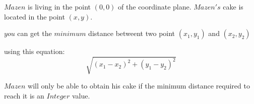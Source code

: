 $Mazen$ is living in the point $(0,0)$ of the coordinate plane. $Mazen's$ cake is located in the point $(x,y)$.

$you$ can get the $minimum$ distance betweent two point $(x_1,y_1)$ and $(x_2,y_2)$

using this equation:
$$ \sqrt{(x_1 - x_2)^2+(y_1-y_2)^2}$$

$Mazen$ will only be able to obtain his cake if the minimum distance required to reach it is an \large{$Integer$} value.

